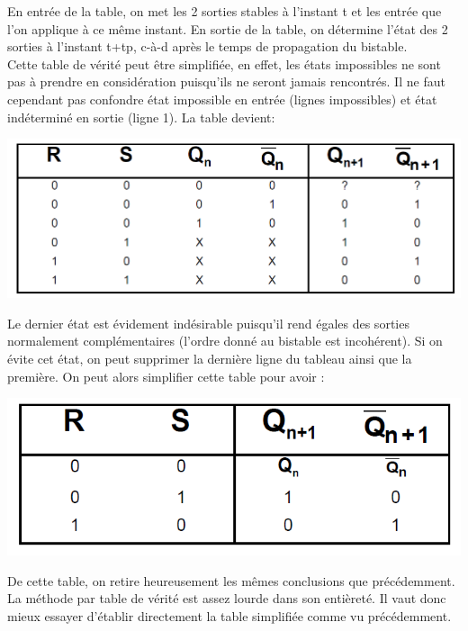 En entrée de la table, on met les 2 sorties stables à l'instant t et les entrée que l'on applique à ce
même instant. En sortie de la table, on détermine l'état des 2 sorties à l'instant t+tp, c-à-d après le
temps de propagation du bistable.\\

Cette table de vérité peut être simplifiée, en effet, les états impossibles ne sont pas à prendre en
considération puisqu'ils ne seront jamais rencontrés. Il ne faut cependant pas confondre état
impossible en entrée (lignes impossibles) et état indéterminé en sortie (ligne 1). La table devient:
\begin{center}
\includegraphics[scale=0.6]{Labo3_RS_tab2.png}
\end{center}

Le dernier état est évidement indésirable puisqu'il rend égales des sorties normalement
complémentaires (l'ordre donné au bistable est incohérent). Si on évite cet état, on peut supprimer la
dernière ligne du tableau ainsi que la première. On peut alors simplifier cette table pour avoir :
\begin{center}
\includegraphics[scale=0.6]{Labo3_RS_tab3.png}
\end{center}

De cette table, on retire heureusement les mêmes conclusions que précédemment.\\


La méthode par table de vérité est assez lourde dans son entièreté. Il vaut donc mieux essayer
d'établir directement la table simplifiée comme vu précédemment.

